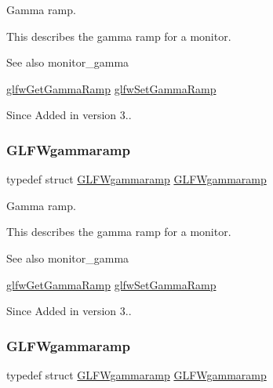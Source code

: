 Gamma ramp. 

This describes the gamma ramp for a monitor.

\begin{DoxySeeAlso}{See also}
monitor\+\_\+gamma 

\hyperlink{group__monitor_gafe7b41852c1a14fe978f0e5381969885}{glfw\+Get\+Gamma\+Ramp} \hyperlink{group__monitor_gac9f36a1cfa10eab191d3029ea8bc9558}{glfw\+Set\+Gamma\+Ramp}
\end{DoxySeeAlso}
\begin{DoxySince}{Since}
Added in version 3.. 
\end{DoxySince}
\mbox{\label{group__monitor_gaec0bd37af673be8813592849f13e02f0}} 
\subsubsection{\texorpdfstring{G\+L\+F\+Wgammaramp}{GLFWgammaramp}\hspace{0.1cm}{\footnotesize\ttfamily [3/5]}}
{\footnotesize\ttfamily typedef struct \hyperlink{structGLFWgammaramp}{G\+L\+F\+Wgammaramp}  \hyperlink{structGLFWgammaramp}{G\+L\+F\+Wgammaramp}}



Gamma ramp. 

This describes the gamma ramp for a monitor.

\begin{DoxySeeAlso}{See also}
monitor\+\_\+gamma 

\hyperlink{group__monitor_gafe7b41852c1a14fe978f0e5381969885}{glfw\+Get\+Gamma\+Ramp} \hyperlink{group__monitor_gac9f36a1cfa10eab191d3029ea8bc9558}{glfw\+Set\+Gamma\+Ramp}
\end{DoxySeeAlso}
\begin{DoxySince}{Since}
Added in version 3.. 
\end{DoxySince}
\mbox{\label{group__monitor_gaec0bd37af673be8813592849f13e02f0}} 
\subsubsection{\texorpdfstring{G\+L\+F\+Wgammaramp}{GLFWgammaramp}\hspace{0.1cm}{\footnotesize\ttfamily [4/5]}}
{\footnotesize\ttfamily typedef struct \hyperlink{structGLFWgammaramp}{G\+L\+F\+Wgammaramp}  \hyperlink{structGLFWgammaramp}{G\+L\+F\+Wgammaramp}}



